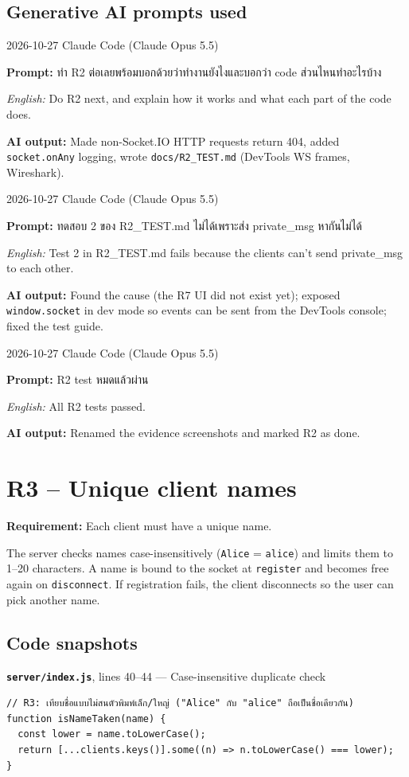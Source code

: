\documentclass[11pt,a4paper]{article}
\newcommand{\code}[1]{\texttt{#1}}
\newcommand{\req}[1]{\begin{tcolorbox}[colback=accent!6,colframe=accent!60,boxrule=0.5pt,left=4pt,right=4pt,top=2pt,bottom=2pt]\textbf{Requirement:} #1\end{tcolorbox}}
\newcommand{\snap}[3]{\par\medskip\textbf{\code{#1}}, lines #2 --- #3}
\newcommand{\promptbox}[4]{%
\begin{tcolorbox}[colback=codebg,colframe=gray!50,boxrule=0.4pt,left=4pt,right=4pt,top=2pt,bottom=2pt]
{\small #1 \quad Claude Code (Claude Opus 5.5)}\par
\textbf{Prompt:} #2\par
\textit{English:} #3\par
\textbf{AI output:} #4
\end{tcolorbox}}
\begin{document}
\subsection*{Generative AI prompts used}
\promptbox{2026-10-27}{ทำ R2 ต่อเลยพร้อมบอกด้วยว่าทำงานยังไงและบอกว่า code ส่วนไหนทำอะไรบ้าง}{Do R2 next, and explain how it works and what each part of the code does.}{Made non-Socket.IO HTTP requests return 404, added \code{socket.onAny} logging, wrote \code{docs/R2\_TEST.md} (DevTools WS frames, Wireshark).}
\promptbox{2026-10-27}{ทดสอบ 2 ของ R2\_TEST.md ไม่ได้เพราะส่ง private\_msg หากันไม่ได้}{Test 2 in R2\_TEST.md fails because the clients can't send private\_msg to each other.}{Found the cause (the R7 UI did not exist yet); exposed \code{window.socket} in dev mode so events can be sent from the DevTools console; fixed the test guide.}
\promptbox{2026-10-27}{R2 test หมดแล้วผ่าน}{All R2 tests passed.}{Renamed the evidence screenshots and marked R2 as done.}

\clearpage
\section{R3 -- Unique client names}
\req{Each client must have a unique name.}

The server checks names case-insensitively (\code{Alice} = \code{alice}) and
limits them to 1--20 characters. A name is bound to the socket at \code{register} and becomes free
again on \code{disconnect}. If registration fails, the client disconnects so the user can pick another name.

\subsection*{Code snapshots}
\snap{server/index.js}{40--44}{Case-insensitive duplicate check}
\begin{Verbatim}[firstnumber=40]
// R3: เทียบชื่อแบบไม่สนตัวพิมพ์เล็ก/ใหญ่ ("Alice" กับ "alice" ถือเป็นชื่อเดียวกัน)
function isNameTaken(name) {
  const lower = name.toLowerCase();
  return [...clients.keys()].some((n) => n.toLowerCase() === lower);
}
\end{Verbatim}
\end{document}
